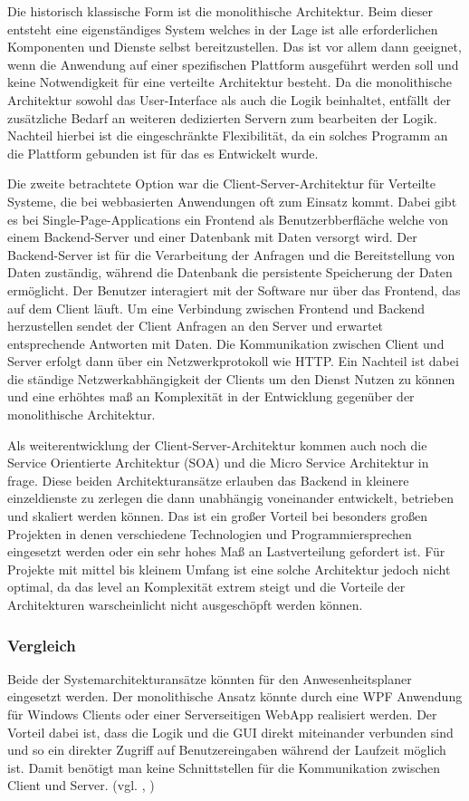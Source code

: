 Die historisch klassische Form ist die monolithische Architektur. Beim dieser entsteht eine eigenständiges System welches in der Lage ist alle erforderlichen Komponenten und Dienste selbst bereitzustellen. Das ist vor allem dann geeignet, wenn die Anwendung auf einer spezifischen Plattform ausgeführt werden soll und keine Notwendigkeit für eine verteilte Architektur besteht. Da die monolithische Architektur sowohl das User-Interface als auch die Logik beinhaltet, entfällt der zusätzliche Bedarf an weiteren dedizierten Servern zum bearbeiten der Logik. Nachteil hierbei ist die eingeschränkte Flexibilität, da ein solches Programm an die Plattform gebunden ist für das es Entwickelt wurde.

Die zweite betrachtete Option war die Client-Server-Architektur für Verteilte Systeme, die bei webbasierten Anwendungen oft zum Einsatz kommt. Dabei gibt es \zB bei Single-Page-Applications ein Frontend als Benutzerbberfläche welche von einem Backend-Server und einer Datenbank mit Daten versorgt wird. Der Backend-Server ist für die Verarbeitung der Anfragen und die Bereitstellung von Daten zuständig, während die Datenbank die persistente Speicherung der Daten ermöglicht. Der Benutzer interagiert mit der Software nur über das Frontend, das auf dem Client läuft. Um eine Verbindung zwischen Frontend und Backend herzustellen sendet der Client Anfragen an den Server und erwartet entsprechende Antworten mit Daten. Die Kommunikation zwischen Client und Server erfolgt dann über ein Netzwerkprotokoll wie HTTP. Ein Nachteil ist dabei die ständige Netzwerkabhängigkeit der Clients um den Dienst Nutzen zu können und eine erhöhtes maß an Komplexität in der Entwicklung gegenüber der monolithische Architektur.

Als weiterentwicklung der Client-Server-Architektur kommen auch noch die Service Orientierte Architektur (SOA) und die Micro Service Architektur in frage. Diese beiden Architekturansätze erlauben das Backend in kleinere einzeldienste zu zerlegen die dann unabhängig voneinander entwickelt, betrieben und skaliert werden können. Das ist ein großer Vorteil bei besonders großen Projekten in denen verschiedene Technologien und Programmiersprechen eingesetzt werden oder ein sehr hohes Maß an Lastverteilung gefordert ist. Für Projekte mit mittel bis kleinem Umfang ist eine solche Architektur jedoch nicht optimal, da das level an Komplexität extrem steigt und die Vorteile der Architekturen warscheinlicht nicht ausgeschöpft werden können.

\subsubsection{Vergleich}
\label{sec:Vergleich}
Beide der Systemarchitekturansätze könnten für den Anwesenheitsplaner eingesetzt werden. Der monolithische Ansatz könnte durch eine WPF Anwendung für Windows Clients oder einer Serverseitigen WebApp realisiert werden. Der Vorteil dabei ist, dass die Logik und die GUI direkt miteinander verbunden sind und so ein direkter Zugriff auf Benutzereingaben während der Laufzeit möglich ist. Damit benötigt man keine Schnittstellen für die Kommunikation zwischen Client und Server. (vgl. \cite{wpf}, \cite{modernApp})


